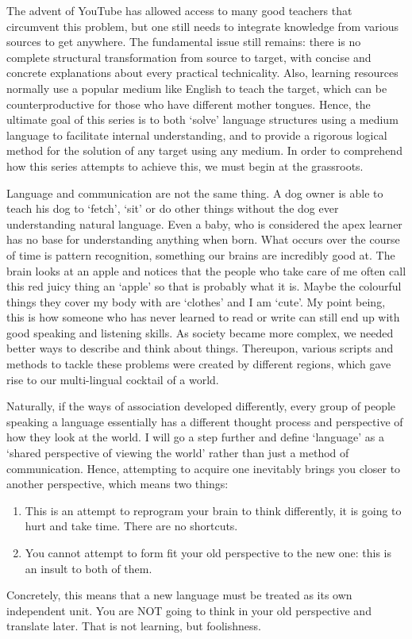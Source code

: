The advent of YouTube has allowed access to many  good teachers that circumvent this problem, but one still needs to integrate knowledge from various sources to get anywhere. The fundamental issue still remains: there is no  complete structural transformation from source to target, with concise and concrete explanations about every practical technicality. Also, learning resources normally use a popular medium like English to teach the target, which can be counterproductive for those who have different mother tongues. Hence, the ultimate goal of this series is to both  `solve' language structures using a medium language to facilitate internal understanding, and to provide a rigorous logical method for the solution of any target using any medium. In order to comprehend how this series attempts to achieve this, we must begin at the grassroots.

Language and communication are not the same thing. A dog owner is able to teach his dog to `fetch', `sit' or do other things without the dog ever understanding natural language. Even a baby, who is considered the apex learner  has no base for understanding anything when born. What occurs over the course of time is pattern recognition, something our brains are incredibly good at. The brain looks at an apple and notices that the people who take care of me often call this red juicy thing an `apple' so that is probably what it is. Maybe the colourful things they cover my body with are `clothes' and I am `cute'. My point being, this is how someone who has never learned to read or write can still end up with good speaking and listening skills. As society became more complex, we needed better ways to describe and think about things. Thereupon, various scripts and methods to tackle these problems were created by different regions, which gave rise to our multi-lingual cocktail of a world.

Naturally, if the ways of association developed differently, every group of people speaking a language essentially has a different thought process and perspective of how they look at the world. I will go a step further and define `language' as a `shared perspective of viewing the world' rather than just a method of communication. Hence, attempting to acquire one inevitably brings you closer to another perspective, which means two things:
\begin{enumerate}
    \item This is an attempt to reprogram your brain to think differently, it is going to hurt and take time. There are no shortcuts.
    \item You cannot attempt to form fit your old perspective to the new one: this is an insult to both of them.
\end{enumerate}
Concretely, this means that a new language must be treated as its own independent unit. You are NOT going to think in your old perspective and translate later. That is not learning, but foolishness.

